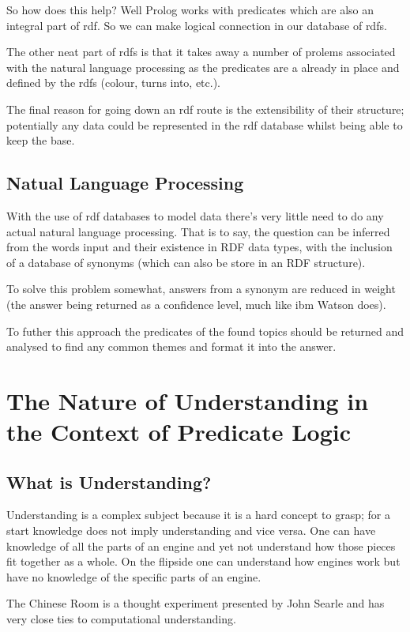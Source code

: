 \documentclass[11pt,a4paper]{report}
\begin{document}
So how does this help? Well Prolog works with predicates which are also an 
integral part of \gls{rdf}. So we can make logical connection in our database of
\gls{rdf}s.

The other neat part of \gls{rdf}s is that it takes away a number of prolems 
associated with the natural language processing as the predicates are a 
already in place and defined by the \gls{rdf}s (colour, turns into, etc.).

The final reason for going down an \gls{rdf} route is the extensibility of their
structure; potentially any data could be represented in the \gls{rdf} database
whilst being able to keep the base.


\section{Natual Language Processing}
With the use of \gls{rdf} databases to model data there's very little need to
do any actual natural language processing. That is to say, the question can 
be inferred from the words input and their existence in RDF data types, with
the inclusion of a database of synonyms (which can also be store in an RDF
structure). 

To solve this problem somewhat, answers from a synonym are reduced in weight
(the answer being returned as a confidence level, much like \gls{ibm} Watson
does).

To futher this approach the predicates of the found topics should be returned
and analysed to find any common themes and format it into the answer.

\chapter{The Nature of Understanding in the Context of Predicate Logic}

\section{What is Understanding?}
Understanding is a complex subject because it is a hard concept to grasp;
for a start knowledge does not imply understanding and vice versa. One can
have knowledge of all the parts of an engine and yet not understand how those
pieces fit together as a whole. On the flipside one can understand how engines
work but have no knowledge of the specific parts of an engine.

The Chinese Room is a thought experiment presented by John Searle and has very
close ties to computational understanding.
\end{document}
